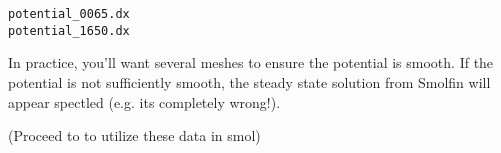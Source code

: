 \documentclass{article}
\begin{document}

\begin{verbatim}
potential_0065.dx
potential_1650.dx
\end{verbatim}

In practice, you'll want several meshes to ensure the potential is smooth. If the potential is not sufficiently smooth, the steady state solution from Smolfin will appear spectled (e.g. its completely wrong!). 

(Proceed to  to utilize these data in smol)


%
%
%




%
%
\end{document}
